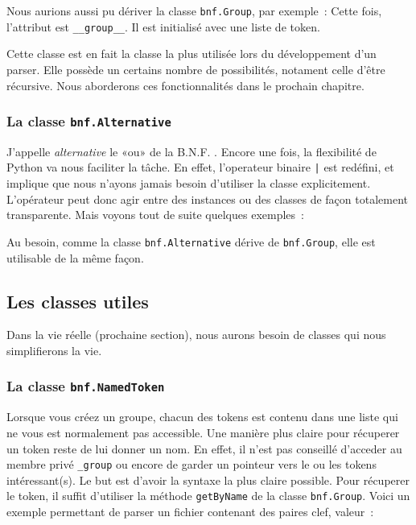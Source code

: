 \documentclass[a4paper]{article}
\newcommand{\fixed}[1]{\texttt{#1}}
\newcommand{\bnf}{B.N.F. }
\begin{document}
                Nous aurions aussi pu dériver la classe \fixed{bnf.Group}, par
                exemple~:
                Cette fois, l'attribut est \fixed{\_\_group\_\_}. Il est initialisé
                avec une liste de token.

                Cette classe est en fait la classe la plus utilisée lors du développement
                d'un parser. Elle possède un certains nombre de possibilités, notament
                celle d'être récursive. Nous aborderons ces fonctionnalités dans le
                prochain chapitre.

            \subsubsection{La classe \fixed{bnf.Alternative}}
                J'appelle \emph{alternative} le «ou» de la \bnf. Encore une fois,
                la flexibilité de Python va nous faciliter la tâche. En effet, l'operateur
                binaire \fixed{|} est redéfini, et implique que nous n'ayons jamais
                besoin d'utiliser la classe explicitement. L'opérateur peut donc agir
                entre des instances ou des classes de façon totalement transparente.
                Mais voyons tout de suite quelques exemples~:

                Au besoin, comme la classe \fixed{bnf.Alternative} dérive de \fixed{bnf.Group},
                elle est utilisable de la même façon.

        \subsection{Les classes utiles}
            Dans la vie réelle (prochaine section), nous aurons besoin de classes qui
            nous simplifierons la vie.

            \subsubsection{La classe \fixed{bnf.NamedToken}}
                Lorsque vous créez un groupe, chacun des tokens est contenu dans une liste
                qui ne vous est normalement pas accessible. Une manière plus claire pour
                récuperer un token reste de lui donner un nom. En effet, il n'est pas conseillé
                d'acceder au membre privé \fixed{\_group} ou encore de garder un pointeur vers
                le ou les tokens intéressant(s). Le but est d'avoir la syntaxe la plus
                claire possible. Pour récuperer le token, il suffit d'utiliser la méthode
                \fixed{getByName} de la classe \fixed{bnf.Group}.
                Voici un exemple permettant de parser un fichier contenant des paires
                clef, valeur~:
\end{document}
